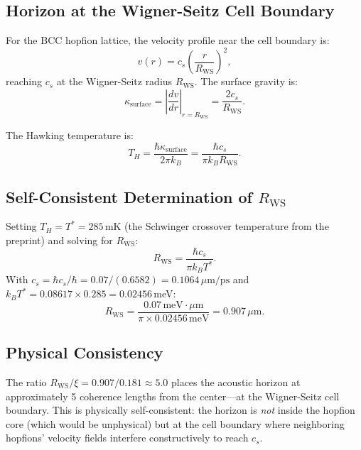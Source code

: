 \documentclass[11pt,letterpaper]{article}
\begin{document}
\subsection{Horizon at the Wigner-Seitz Cell Boundary}

For the BCC hopfion lattice, the velocity profile near the cell boundary is:
\begin{equation}
v(r) = c_s \left(\frac{r}{R_{\text{WS}}}\right)^2,
\end{equation}
reaching $c_s$ at the Wigner-Seitz radius $R_{\text{WS}}$. The surface gravity is:
\begin{equation}
\kappa_{\text{surface}} = \left|\frac{dv}{dr}\right|_{r=R_{\text{WS}}} = \frac{2c_s}{R_{\text{WS}}}.
\end{equation}

The Hawking temperature is:
\begin{equation}
T_H = \frac{\hbar \kappa_{\text{surface}}}{2\pi k_B} = \frac{\hbar c_s}{\pi k_B R_{\text{WS}}}.
\label{eq:hawking_temp}
\end{equation}

\subsection{Self-Consistent Determination of $R_{\text{WS}}$}

Setting $T_H = T^* = 285$\,mK (the Schwinger crossover temperature from the preprint) and solving for $R_{\text{WS}}$:
\begin{equation}
R_{\text{WS}} = \frac{\hbar c_s}{\pi k_B T^*}.
\end{equation}
With $c_s = \hbar c_s / \hbar = 0.07/(0.6582) = 0.1064\,\mu\text{m/ps}$ and $k_B T^* = 0.08617 \times 0.285 = 0.02456$\,meV:
\begin{equation}
\boxed{R_{\text{WS}} = \frac{0.07\,\text{meV}\cdot\mu\text{m}}{\pi \times 0.02456\,\text{meV}} = 0.907\,\mu\text{m}.}
\label{eq:RWS}
\end{equation}

\subsection{Physical Consistency}

The ratio $R_{\text{WS}}/\xi = 0.907/0.181 \approx 5.0$ places the acoustic horizon at approximately 5 coherence lengths from the center---at the Wigner-Seitz cell boundary. This is physically self-consistent: the horizon is \textit{not} inside the hopfion core (which would be unphysical) but at the cell boundary where neighboring hopfions' velocity fields interfere constructively to reach $c_s$.
\end{document}
